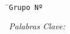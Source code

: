



		\title{{\Large{\textbf{\myTitle}}} \\
				\vspace{0.4cm}
				\normalsize\underline{\textbf{\mySubtitle}} \\
		\author{\small{\textsc{\mySubject}}}}
		\date{\small{\myTimePeriod}}
	\maketitle


\ifPutgroup
	\begin{tabbing}
\hspace{6.7cm}\=\+\texttt{Grupo Nº\myGroupNumber}\hspace{5cm}\=
	\end{tabbing}
\fi
	\begin{tabbing}

		\hspace{2cm} \MembersHeader
		
		\newline \vspace{1cm}
		\MembersOnCover

	\end{tabbing}

%		



\ifKeywords
	\begin{center}
		\emph{Palabras Clave: \myKeywords}
	\end{center}
\fi



\ifPagebreak
	\pagebreak
\fi
	\ifIndex
		\tableofcontents
	\fi

\ifPagebreak
	\pagebreak
\fi



